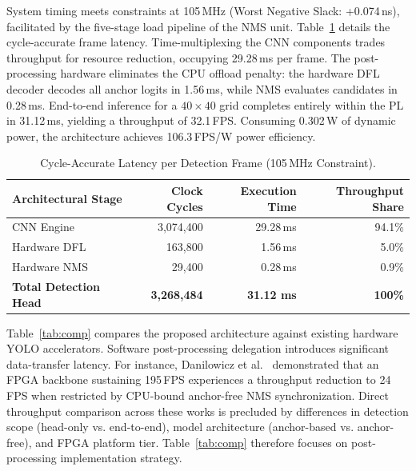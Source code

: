 \documentclass{svproc}
\begin{document}
System timing meets constraints at 105\,MHz (Worst Negative Slack: +0.074\,ns), facilitated by the five-stage load pipeline of the NMS unit. Table~\ref{tab:latency} details the cycle-accurate frame latency. Time-multiplexing the CNN components trades throughput for resource reduction, occupying 29.28\,ms per frame. The post-processing hardware eliminates the CPU offload penalty: the hardware DFL decoder decodes all anchor logits in 1.56\,ms, while NMS evaluates candidates in 0.28\,ms. End-to-end inference for a $40{\times}40$ grid completes entirely within the PL in 31.12\,ms, yielding a throughput of 32.1\,FPS. Consuming 0.302\,W of dynamic power, the architecture achieves 106.3\,FPS/W power efficiency.

\begin{table}[H]
\centering
\caption{Cycle-Accurate Latency per Detection Frame (105\,MHz Constraint).}
\label{tab:latency}
\begin{tabular}{lrrr}
\toprule
\textbf{Architectural Stage} & \textbf{Clock Cycles} & \textbf{Execution Time} & \textbf{Throughput Share} \\
\midrule
CNN Engine & 3,074,400 & 29.28\,ms & 94.1\% \\
Hardware DFL & 163,800 & 1.56\,ms & 5.0\% \\
Hardware NMS & 29,400 & 0.28\,ms & 0.9\% \\
\midrule
\textbf{Total Detection Head} & \textbf{3,268,484} & \textbf{31.12 ms} & \textbf{100\%} \\
\bottomrule
\end{tabular}
\end{table}

Table~\ref{tab:comp} compares the proposed architecture against existing hardware YOLO accelerators. Software post-processing delegation introduces significant data-transfer latency. For instance, Danilowicz et al.~\cite{danilowicz2025sort} demonstrated that an FPGA backbone sustaining 195\,FPS experiences a throughput reduction to 24\,FPS when restricted by CPU-bound anchor-free NMS synchronization. Direct throughput comparison across these works is precluded by differences in detection scope (head-only vs. end-to-end), model architecture (anchor-based vs. anchor-free), and FPGA platform tier. Table~\ref{tab:comp} therefore focuses on post-processing implementation strategy.
\end{document}
